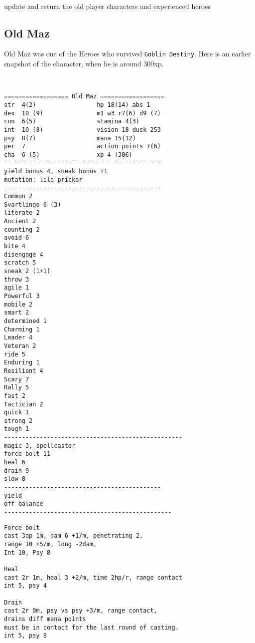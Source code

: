 \

\vfill


\todo update and return the old player characters and experienced heroes





\clearpage
\begin{samepage}
\subsection*{Old Maz}
Old Maz was one of the Heroes who survived \texttt{Goblin Destiny}. Here is an earlier snapshot of the character, when he is around 300xp.

\

\small \begin{verbatim}
================== Old Maz ==================
str  4(2)                 hp 18(14) abs 1
dex  10 (9)               m1 w3 r7(6) d9 (7)
con  6(5)                 stamina 4(3)
int  10 (8)               vision 18 dusk 253
psy  8(7)                 mana 15(12)
per  7                    action points 7(6)
cha  6 (5)                xp 4 (306)
--------------------------------------------
yield bonus 4, sneak bonus +1
mutation: lila prickar
--------------------------------------------
Common 2
Svartlingo 6 (3)
literate 2
Ancient 2
counting 2
avoid 6
bite 4
disengage 4
scratch 5
sneak 2 (1+1)
throw 3
agile 1
Powerful 3
mobile 2
smart 2
determined 1
Charming 1
Leader 4
Veteran 2
ride 5
Enduring 1
Resilient 4
Scary 7
Rally 5
fast 2
Tactician 2
quick 1
strong 2
tough 1
--------------------------------------------------
magic 3, spellcaster
force bolt 11
heal 6
drain 9
slow 8
--------------------------------------------
yield
off balance
-----------------------------------------------
\end{verbatim} \end{samepage} \clearpage \begin{samepage} \begin{verbatim}
Force bolt
cast 3ap 1m, dam 6 +1/m, penetrating 2,
range 10 +5/m, long -2dam,
Int 10, Psy 8

Heal
cast 2r 1m, heal 3 +2/m, time 2hp/r, range contact
int 5, psy 4

Drain
cast 2r 0m, psy vs psy +3/m, range contact,
drains diff mana points
must be in contact for the last round of casting.
int 5, psy 8


\end{verbatim}
\end{samepage}
